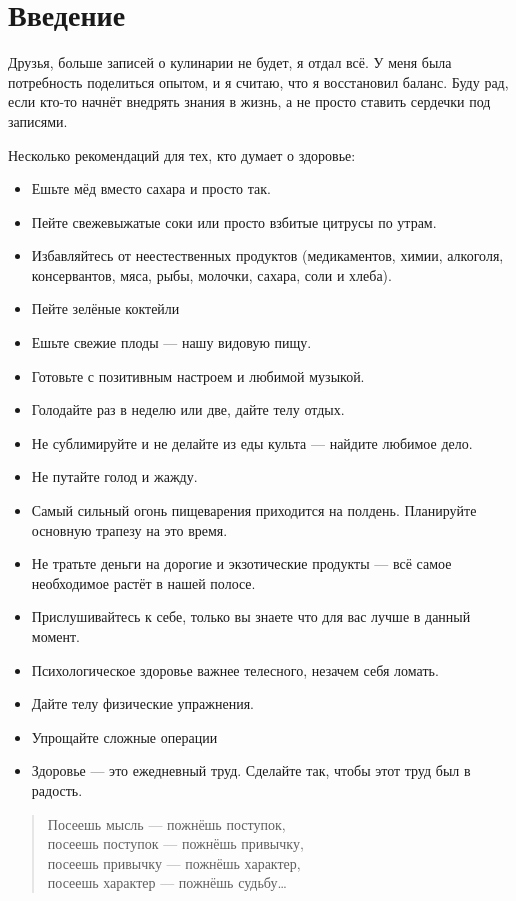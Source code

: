 \chapter{Введение}

Друзья, больше записей о кулинарии не будет, я отдал всё. У меня была потребность поделиться опытом, и я считаю, что я восстановил баланс. Буду рад, если кто-то начнёт внедрять знания в жизнь, а не просто ставить сердечки под записями. 

Несколько рекомендаций для тех, кто думает о здоровье:
\begin{itemize}
\item Ешьте мёд вместо сахара и просто так.
\item Пейте свежевыжатые соки или просто взбитые цитрусы по утрам.
\item  Избавляйтесь от неестественных продуктов (медикаментов, химии, алкоголя, консервантов, мяса, рыбы, молочки, сахара, соли и хлеба).
\item Пейте зелёные коктейли
\item  Ешьте свежие плоды — нашу видовую пищу.
\item Готовьте с позитивным настроем и любимой музыкой.
\item Голодайте раз в неделю или две, дайте телу отдых.
\item  Не сублимируйте и не делайте из еды культа — найдите любимое дело.
\item Не путайте голод и жажду. 
\item Самый сильный огонь пищеварения приходится на полдень. Планируйте основную трапезу на это время.
\item Не тратьте деньги на дорогие и экзотические продукты — всё самое необходимое растёт в нашей полосе.
\item  Прислушивайтесь к себе, только вы знаете что для вас лучше в данный момент.
\item Психологическое здоровье важнее телесного, незачем себя ломать.
\item Дайте телу физические упражнения.
\item Упрощайте сложные операции
\item Здоровье — это ежедневный труд. Сделайте так, чтобы этот труд был в радость.
\end{itemize}

\begin{quote}
    \centering
Посеешь мысль — пожнёшь поступок,\\
посеешь поступок — пожнёшь привычку,\\
посеешь привычку — пожнёшь характер,\\
посеешь характер — пожнёшь судьбу\ldots 
\end{quote}
